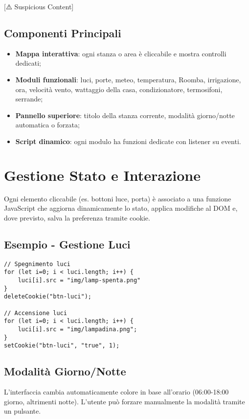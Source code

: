 [⚠️ Suspicious Content] \documentclass[a4paper,12pt]{article}
\begin{document}
\subsection{Componenti Principali}

\begin{itemize}
  \item \textbf{Mappa interattiva}: ogni stanza o area è cliccabile e mostra controlli dedicati;
  \item \textbf{Moduli funzionali}: luci, porte, meteo, temperatura, Roomba, irrigazione, ora, velocità vento, wattaggio della casa, condizionatore, termosifoni, serrande;
  \item \textbf{Pannello superiore}: titolo della stanza corrente, modalità giorno/notte automatica o forzata;
  \item \textbf{Script dinamico}: ogni modulo ha funzioni dedicate con listener su eventi.
\end{itemize}

\section{Gestione Stato e Interazione}

Ogni elemento cliccabile (es. bottoni luce, porta) è associato a una funzione JavaScript che aggiorna dinamicamente lo stato, applica modifiche al DOM e, dove previsto, salva la preferenza tramite cookie.

\subsection{Esempio - Gestione Luci}

\begin{lstlisting}
// Spegnimento luci
for (let i=0; i < luci.length; i++) {
    luci[i].src = "img/lamp-spenta.png"
}
deleteCookie("btn-luci");

// Accensione luci
for (let i=0; i < luci.length; i++) {
    luci[i].src = "img/lampadina.png";
}
setCookie("btn-luci", "true", 1);
\end{lstlisting}

\subsection{Modalità Giorno/Notte}

L’interfaccia cambia automaticamente colore in base all’orario (06:00-18:00 giorno, altrimenti notte). L’utente può forzare manualmente la modalità tramite un pulsante.
\end{document}
